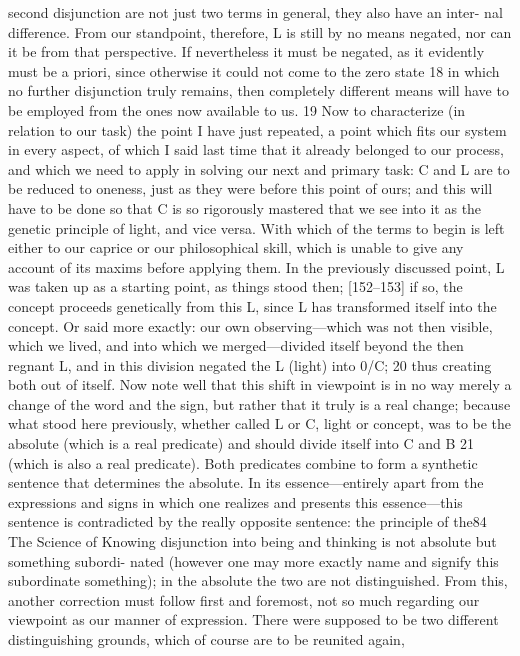 second disjunction are not just two terms in general, they also have an inter-
nal difference. From our standpoint, therefore, L is still by no means negated,
nor can it be from that perspective. If nevertheless it must be negated, as it
evidently must be a priori, since otherwise it could not come to the zero state 18
in which no further disjunction truly remains, then completely different
means will have to be employed from the ones now available to us. 19
Now to characterize (in relation to our task) the point I have just
repeated, a point which fits our system in every aspect, of which I said last
time that it already belonged to our process, and which we need to apply in
solving our next and primary task: C and L are to be reduced to oneness, just
as they were before this point of ours; and this will have to be done so that C
is so rigorously mastered that we see into it as the genetic principle of light,
and vice versa. With which of the terms to begin is left either to our caprice or
our philosophical skill, which is unable to give any account of its maxims
before applying them. In the previously discussed point, L was taken up as a
starting point, as things stood then; [152–153] if so, the concept proceeds
genetically from this L, since L has transformed itself into the concept. Or
said more exactly: our own observing—which was not then visible, which we
lived, and into which we merged—divided itself beyond the then regnant L,
and in this division negated the L (light) into 0/C; 20 thus creating both out of
itself. Now note well that this shift in viewpoint is in no way merely a change
of the word and the sign, but rather that it truly is a real change; because what
stood here previously, whether called L or C, light or concept, was to be the
absolute (which is a real predicate) and should divide itself into C and B 21
(which is also a real predicate). Both predicates combine to form a synthetic
sentence that determines the absolute. In its essence—entirely apart from the
expressions and signs in which one realizes and presents this essence—this
sentence is contradicted by the really opposite sentence: the principle of the84
The Science of Knowing
disjunction into being and thinking is not absolute but something subordi-
nated (however one may more exactly name and signify this subordinate
something); in the absolute the two are not distinguished. From this,
another correction must follow first and foremost, not so much regarding
our viewpoint as our manner of expression. There were supposed to be two
different distinguishing grounds, which of course are to be reunited again,
